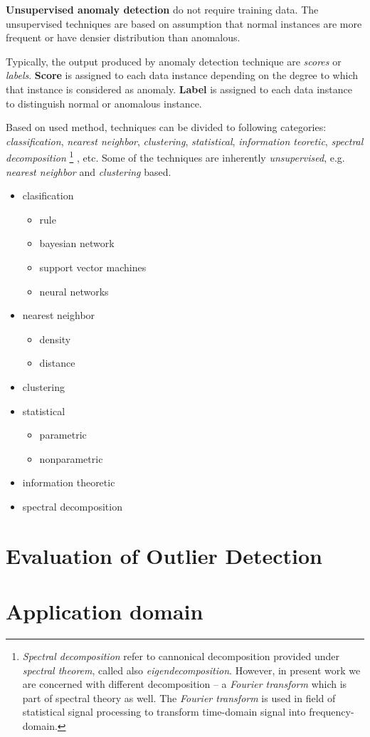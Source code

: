 \textbf{Unsupervised anomaly detection} do not require training data. The unsupervised 
techniques are based on assumption that normal instances are more frequent or have densier distribution
than anomalous.	


Typically, the output produced by anomaly detection technique are \emph{scores} or \emph{labels}.
%
\textbf{Score} is assigned to each data instance depending on the degree to which that instance is 
considered as anomaly.
\textbf{Label} is assigned to each data instance to distinguish normal or anomalous instance.

Based on used method, techniques can be divided to following categories: \emph{classification},
\emph{nearest neighbor}, \emph{clustering}, \emph{statistical}, \emph{information teoretic},
\emph{spectral decomposition}%
\footnote{
	\emph{Spectral decomposition} refer to cannonical decomposition provided under 
	\emph{spectral theorem}, called also \emph{eigendecomposition}.
	However, in present work we are concerned with different decomposition -- a 
	\emph{Fourier transform} which is part of spectral theory as well. 
	The \emph{Fourier transform} is used 
	in field of statistical signal processing to transform time-domain signal into frequency-domain.
	
}%
, etc. Some of the techniques are inherently \emph{unsupervised}, e.g. \emph{nearest neighbor} and 
\emph{clustering} based.
\begin{itemize}
	\item clasification 
	\begin{itemize}
		\item rule 
		\item bayesian network 
		\item support vector machines
		\item neural networks
	\end{itemize}
	\item nearest neighbor
	\begin{itemize}
		\item density  
		\item distance
	\end{itemize}
	\item clustering
	\item statistical
	\begin{itemize}
		\item parametric  
		\item nonparametric
	\end{itemize}
	\item information theoretic
	\item spectral decomposition
\end{itemize}

\section{Evaluation of Outlier Detection}

\section{Application domain}
